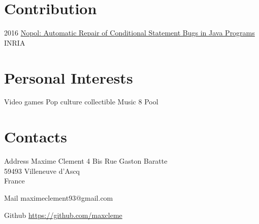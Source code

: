 \documentclass[hidelinks]{cv-style}          %
\begin{document}


\section{Contribution}
\begin{entrylist}

\entry
{2016}
{\href{https://hal.archives-ouvertes.fr/hal-01285008}{Nopol: Automatic Repair of Conditional Statement Bugs in Java Programs}}
{INRIA}
{\vspace{-0.3cm}}

\end{entrylist}
\leavevmode\newline



\section{Personal Interests}
\begin{entrylist}
\entry
{Video games}
{}
{}
{\vspace{-0.3cm}}
\entry
{Pop culture collectible}
{}
{}
{\vspace{-0.3cm}}
\entry
{Music}
{}
{}
{\vspace{-0.3cm}}
\entry
{8 Pool}
{}
{}
{\vspace{-0.3cm}}		
\end{entrylist}
\leavevmode\newline


\section{Contacts}

\begin{entrylist}
\entry
  {Address}
  {Maxime Clement}
  {}
  {
  4 Bis Rue Gaston Baratte\\
59493 Villeneuve d'Ascq\\ 
France\\
}

\entry
  {Mail}
  {maximeclement93@gmail.com}
  {}
  {}
  
\entry
  {Github}
  {\url{https://github.com/maxcleme}}
  {}
  {}
\end{entrylist}
\end{document}
